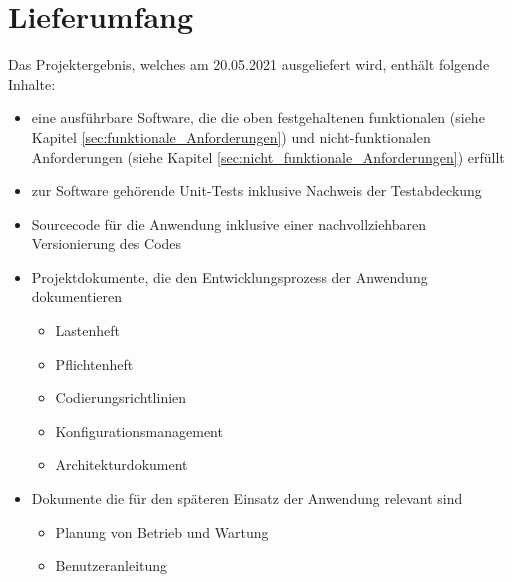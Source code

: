 \chapter{Lieferumfang}
\label{sec:chap6}
Das Projektergebnis, welches am 20.05.2021 ausgeliefert wird, enthält folgende Inhalte:
\begin{itemize}
\item eine ausführbare Software, die die oben festgehaltenen funktionalen (siehe Kapitel \ref{sec:funktionale_Anforderungen}) und nicht-funktionalen Anforderungen (siehe Kapitel \ref{sec:nicht_funktionale_Anforderungen}) erfüllt
\item zur Software gehörende Unit-Tests inklusive Nachweis der Testabdeckung
\item Sourcecode für die Anwendung inklusive einer nachvollziehbaren Versionierung des Codes
\item Projektdokumente, die den Entwicklungsprozess der Anwendung dokumentieren
	\begin{itemize}
		\item Lastenheft
		\item Pflichtenheft
		\item Codierungsrichtlinien
		\item Konfigurationsmanagement
		\item Architekturdokument
	\end{itemize} 
\item Dokumente die für den späteren Einsatz der Anwendung relevant sind
	\begin{itemize}
		\item Planung von Betrieb und Wartung
		\item Benutzeranleitung
	\end{itemize}
\end{itemize}